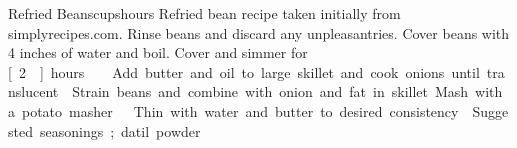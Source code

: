 \begin{recipe}{Refried Beans}{\unit[4]{cups}}{\unit[3]{hours}}
\freeform Refried bean recipe taken initially from simplyrecipes.com.
Rinse beans and discard any unpleasantries.  Cover beans with 4 inches
of water and boil.  Cover and simmer for \unit[2]{hours}.
Add butter and oil to large skillet and cook onions until translucent.
\newstep Strain beans and combine with onion and fat in skillet.  Mash with a potato masher.
Thin with water and butter to desired consistency.
  Suggested seasonings; datil powder
\end{recipe}
